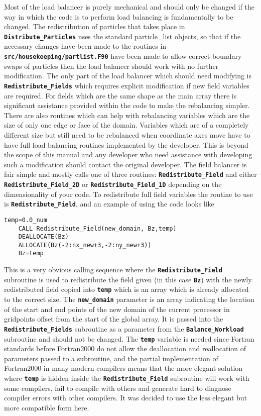 \documentclass[12pt,a4paper]{article}
\newcommand{\simpleboxverbatim}{\begin{Verbatim}[obeytabs=true,frame=single,
  framerule=0.5mm,rulecolor=\color{warwickmid},formatcom=\color{black}]}
\newcommand{\inlinecode}[1]{{\color{warwickred} \bf\texttt{#1}}}
\begin{document}
Most of the load balancer is purely mechanical and should only be changed if
the way in which the code is to perform load balancing is fundamentally to be
changed. The redistribution of particles that takes place in
\inlinecode{Distribute\_Particles} uses the standard particle\_list objects, so
that if the necessary changes have been made to the routines in
\inlinecode{src/housekeeping/partlist.F90} have been made to allow correct
boundary swaps of particles then the load balancer should work with no further
modification. The only part of the load balancer which should need modifying is
\inlinecode{Redistribute\_Fields} which requires explicit modification if new
field variables are required. For fields which are the same shape as the main
array there is significant assistance provided within the code to make the
rebalancing simpler. There are also routines which can help with rebalancing
variables which are the size of only one edge or face of the domain. Variables
which are of a completely different size but still need to be rebalanced when
coordinate axes move have to have full load balancing routines implemented by
the developer. This is beyond the scope of this manual and any developer who
need assistance with developing such a modification should contact the original
developer. The field balancer is fair simple and mostly calls one of three
routines: \inlinecode{Redistribute\_Field} and either
\inlinecode{Redistribute\_Field\_2D} or \inlinecode{Redistribute\_Field\_1D}
depending on the dimensionality of your code. To redistribute full field
variables the routine to use is \inlinecode{Redistribute\_Field}, and an
example of using the code looks like

\simpleboxverbatim
    temp=0.0_num
    CALL Redistribute_Field(new_domain, Bz,temp)
    DEALLOCATE(Bz)
    ALLOCATE(Bz(-2:nx_new+3,-2:ny_new+3))
    Bz=temp
\end{Verbatim}

This is a very obvious calling sequence where the
\inlinecode{Redistribute\_Field} subroutine is used to redistribute the field
given (in this case \inlinecode{Bz}) with the newly redistributed field copied
into \inlinecode{temp} which is an array which is already allocated to the
correct size. The \inlinecode{new\_domain} parameter is an array indicating the
location of the start and end points of the new domain of the current processor
in gridpoints offset from the start of the global array. It is passed into the
\inlinecode{Redistribute\_Fields} subroutine as a parameter from the
\inlinecode{Balance\_Workload} subroutine and should not be changed. The
\inlinecode{temp} variable is needed since Fortran standards before Fortran2000
do not allow the deallocation and reallocation of parameters passed to a
subroutine, and the partial implementation of Fortran2000 in many modern
compilers means that the more elegant solution where \inlinecode{temp} is
hidden inside the \inlinecode{Redistribute\_Field} subroutine will work with
some compilers, fail to compile with others and generate hard to diagnose
compiler errors with other compilers. It was decided to use the less elegant
but more compatible form here.\\
\end{document}
